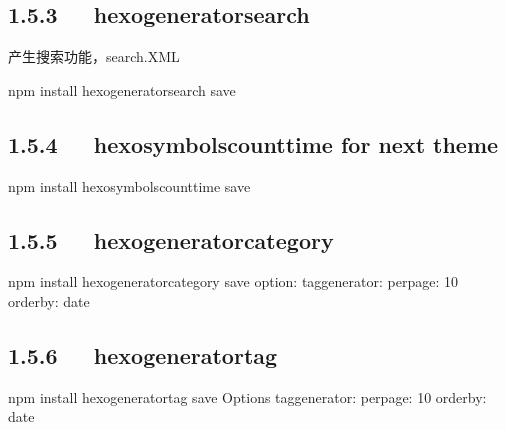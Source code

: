 \documentclass[letterpaper,12pt,english]{sphinxmanual}
\begin{document}
\subsection{1.5.3   hexo\sphinxhyphen{}generator\sphinxhyphen{}search}
\label{\detokenize{001software/001install/001._u7f51_u7ad9/hexo:hexo-generator-search}}
产生搜索功能，search.XML

\begin{sphinxVerbatim}[commandchars=\\\{\}]
\PYGZdl{} npm install hexo\PYGZhy{}generator\PYGZhy{}search \PYGZhy{}\PYGZhy{}save
\end{sphinxVerbatim}


\subsection{1.5.4   hexo\sphinxhyphen{}symbols\sphinxhyphen{}count\sphinxhyphen{}time for next theme}
\label{\detokenize{001software/001install/001._u7f51_u7ad9/hexo:hexo-symbols-count-time-for-next-theme}}
\begin{sphinxVerbatim}[commandchars=\\\{\}]
\PYGZdl{} npm install hexo\PYGZhy{}symbols\PYGZhy{}count\PYGZhy{}time \PYGZhy{}\PYGZhy{}save
\end{sphinxVerbatim}


\subsection{1.5.5   hexo\sphinxhyphen{}generator\sphinxhyphen{}category}
\label{\detokenize{001software/001install/001._u7f51_u7ad9/hexo:hexo-generator-category}}
\begin{sphinxVerbatim}[commandchars=\\\{\}]
\PYGZdl{} npm install hexo\PYGZhy{}generator\PYGZhy{}category \PYGZhy{}\PYGZhy{}save
option:
tag\PYGZus{}generator:
  per\PYGZus{}page: 10
  order\PYGZus{}by: \PYGZhy{}date
\end{sphinxVerbatim}


\subsection{1.5.6   hexo\sphinxhyphen{}generator\sphinxhyphen{}tag}
\label{\detokenize{001software/001install/001._u7f51_u7ad9/hexo:hexo-generator-tag}}
\begin{sphinxVerbatim}[commandchars=\\\{\}]
\PYGZdl{} npm install hexo\PYGZhy{}generator\PYGZhy{}tag \PYGZhy{}\PYGZhy{}save
Options
tag\PYGZus{}generator:
  per\PYGZus{}page: 10
  order\PYGZus{}by: \PYGZhy{}date
\end{sphinxVerbatim}
\end{document}
